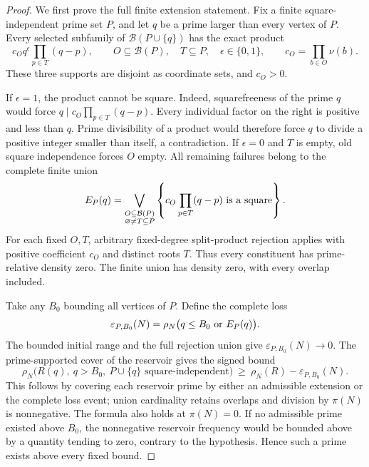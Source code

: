 \documentclass[11pt]{article}
\begin{document}
\begin{proof}
We first prove the full finite extension statement.
Fix a finite square-independent prime set \(P\), and let \(q\) be a prime
larger than every vertex of \(P\).
Every selected subfamily of \(\mathcal B(P\cup\{q\})\) has the exact product
\begin{equation}\label{eq:native-cycle-insertion-product}
 c_Oq^\epsilon\prod_{p\in T}(q-p),\qquad
 O\subseteq\mathcal B(P),\quad T\subseteq P,\quad
 \epsilon\in\{0,1\},\qquad c_O=\prod_{b\in O}\nu(b).
\end{equation}
These three supports are disjoint as coordinate sets, and \(c_O>0\).

If \(\epsilon=1\), the product cannot be square.
Indeed, squarefreeness of the prime \(q\) would force
\(q\mid c_O\prod_{p\in T}(q-p)\).
Every individual factor on the right is positive and less than \(q\).
Prime divisibility of a product would therefore force \(q\) to divide a
positive integer smaller than itself, a contradiction.
If \(\epsilon=0\) and \(T\) is empty, old square independence forces
\(O\) empty. All remaining failures belong to the complete finite union
\[
 E_P(q)=
 \bigvee_{\substack{O\subseteq\mathcal B(P)\\
                   \varnothing\ne T\subseteq P}}
 \left\{c_O\prod_{p\in T}(q-p)\ \hbox{is a square}\right\}.
\]
For each fixed \(O,T\), arbitrary fixed-degree split-product rejection
applies with positive coefficient \(c_O\) and distinct roots \(T\).
Thus every constituent has prime-relative density zero. The finite union
has density zero, with every overlap included.

Take any \(B_0\) bounding all vertices of \(P\). Define the complete loss
\[
 \varepsilon_{P,B_0}(N)=
 \rho_N\bigl(q\leq B_0\ \hbox{or }E_P(q)\bigr).
\]
The bounded initial range and the full rejection union give
\(\varepsilon_{P,B_0}(N)\to0\).
The prime-supported cover of the reservoir gives the signed bound
\begin{equation}\label{eq:native-cycle-reservoir-supply}
 \rho_N\bigl(R(q),\ q>B_0,\ P\cup\{q\}\text{ square-independent}\bigr)
 \ \geq\ \rho_N(R)-\varepsilon_{P,B_0}(N).
\end{equation}
This follows by covering each reservoir prime by either an admissible
extension or the complete loss event; union cardinality retains overlaps
and division by \(\pi(N)\) is nonnegative. The formula also holds at
\(\pi(N)=0\).
If no admissible prime existed above \(B_0\), the nonnegative reservoir
frequency would be bounded above by a quantity tending to zero, contrary
to the hypothesis. Hence such a prime exists above every fixed bound.


\end{proof}
\end{document}
